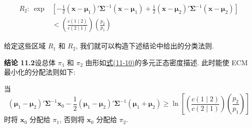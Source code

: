 
\label{eq:11-11}
\begin{equation}
\begin{aligned}
R_2:\ \exp&\left[-\frac{1}{2}(\mathbf{x}-\boldsymbol{\mu}_1)'\boldsymbol{\Sigma}^{-1}(\mathbf{x}-\boldsymbol{\mu}_1)+\frac{1}{2}(\mathbf{x}-\boldsymbol{\mu}_2)'\boldsymbol{\Sigma}^{-1}(\mathbf{x}-\boldsymbol{\mu}_2)\right]\\
&<\left(\frac{c(1\mid2)}{c(2\mid1)}\right)\left(\frac{p_2}{p_1}\right)
\end{aligned}
\tag{11-11}
\end{equation}

给定这些区域 $R_1$ 和 $R_2$, 我们就可以构造下述结论中给出的分类法则.

\noindent\textbf{结论 11.2}\quad 设总体 $\pi_1$ 和 $\pi_2$ 由形如\hyperref[eq:11-10]{式(11-10)}的多元正态密度描述. 此时能使 ECM 最小化的分配法则如下:

当
\label{eq:11-12}
\begin{equation}
(\boldsymbol{\mu}_1-\boldsymbol{\mu}_2)'\boldsymbol{\Sigma}^{-1}\mathbf{x}_0-\frac{1}{2}(\boldsymbol{\mu}_1-\boldsymbol{\mu}_2)'\boldsymbol{\Sigma}^{-1}(\boldsymbol{\mu}_1+\boldsymbol{\mu}_2)\geqslant\ln\left[\left(\frac{c(1\mid2)}{c(2\mid1)}\right)\left(\frac{p_2}{p_1}\right)\right]
\tag{11-12}
\end{equation}
时将 $\mathbf{x}_0$ 分配给 $\pi_1$, 否则将 $\mathbf{x}_0$ 分配给 $\pi_2$.

